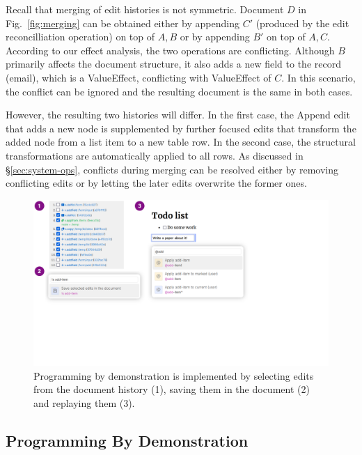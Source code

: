 \documentclass[sigconf,anonymous,screen]{acmart}
\newcommand{\ident}[1]{{\sffamily #1}}
\begin{document}
Recall that merging of edit histories is not symmetric. Document $D$ in Fig.~\ref{fig:merging}
can be obtained either by appending $C'$ (produced by the edit reconcilliation operation)
on top of $A,B$ or by appending $B'$ on top of $A,C$. According to our effect analysis, the two
operations are conflicting. Although $B$ primarily affects the document structure, it also adds
a new field to the record (email), which is a \ident{ValueEffect}, conflicting with
\ident{ValueEffect} of $C$. In this scenario, the conflict can be ignored and the resulting document
is the same in both cases.

However, the resulting two histories will differ. In the first case, the
\ident{Append} edit that adds a new node is supplemented by further focused edits that transform
the added node from a list item to a new table row.
In the second case, the structural transformations are automatically applied to all rows.
As discussed in \S\ref{sec:system-ops}, conflicts during merging can be resolved either by
removing conflicting edits or by letting the later edits overwrite the former ones.


\begin{figure}[t]
\includegraphics[width=0.9\columnwidth,clip,trim=0cm 7cm 9cm 0cm]{fig/pbd.pdf}
\caption{Programming by demonstration is implemented by selecting edits from the document
history (1), saving them in the document (2) and replaying them (3).}
\label{fig:pbd}
\end{figure}


\subsection{Programming By Demonstration}
\label{sec:impl-pbd}
\end{document}
